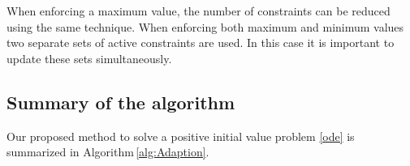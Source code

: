 \documentclass[a4paper]{article}
\numberwithin{equation}{section}
\theoremstyle{plain}
\theoremstyle{definition}
\numberwithin{theorem}{section}
\newcommand{\dt}{{\Delta t}}
\newcommand{\1}{\mathbbm{1}}
\newcommand{\bt}{\tilde{b}}
\newcommand{\pt}{{\tilde{p}}}
\begin{document}
When enforcing a maximum value, the number of constraints can be reduced using the same technique. When enforcing both maximum and minimum values two separate sets of active constraints are used.
In this case it is important to update these sets simultaneously.

\subsection{Summary of the algorithm}

Our proposed method to solve a positive initial value problem \eqref{ode}
is summarized in Algorithm\,\ref{alg:Adaption}.

%
%
\end{document}
